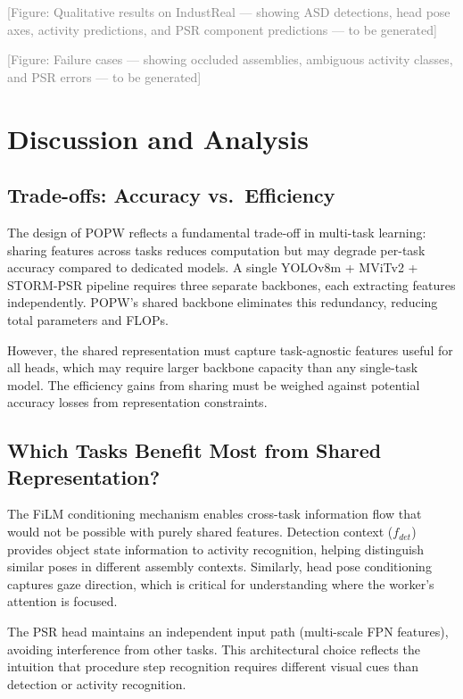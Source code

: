 \documentclass[11pt,a4paper]{article}
\begin{document}
\textcolor{gray}{[Figure: Qualitative results on IndustReal --- showing ASD detections, head pose axes, activity predictions, and PSR component predictions --- to be generated]}

\textcolor{gray}{[Figure: Failure cases --- showing occluded assemblies, ambiguous activity classes, and PSR errors --- to be generated]}

\FloatBarrier

\section{Discussion and Analysis}
\label{sec:discussion}

\subsection{Trade-offs: Accuracy vs.\ Efficiency}

The design of POPW reflects a fundamental trade-off in multi-task learning: sharing features across tasks reduces computation but may degrade per-task accuracy compared to dedicated models. A single YOLOv8m + MViTv2 + STORM-PSR pipeline requires three separate backbones, each extracting features independently. POPW's shared backbone eliminates this redundancy, reducing total parameters and FLOPs.

However, the shared representation must capture task-agnostic features useful for all heads, which may require larger backbone capacity than any single-task model. The efficiency gains from sharing must be weighed against potential accuracy losses from representation constraints.

\subsection{Which Tasks Benefit Most from Shared Representation?}

The FiLM conditioning mechanism enables cross-task information flow that would not be possible with purely shared features. Detection context ($f_{det}$) provides object state information to activity recognition, helping distinguish similar poses in different assembly contexts. Similarly, head pose conditioning captures gaze direction, which is critical for understanding where the worker's attention is focused.

The PSR head maintains an independent input path (multi-scale FPN features), avoiding interference from other tasks. This architectural choice reflects the intuition that procedure step recognition requires different visual cues than detection or activity recognition.
\end{document}
